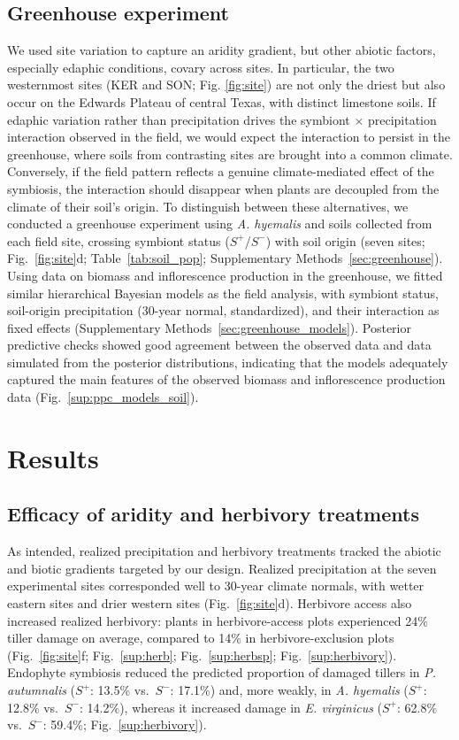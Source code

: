 \documentclass[12pt]{article}\usepackage[]{graphicx}\usepackage[dvipsnames]{xcolor}
\begin{document}
\subsection*{Greenhouse experiment}
We used site variation to capture an aridity gradient, but other abiotic factors, especially edaphic conditions, covary across sites. 
In particular, the two westernmost sites (KER and SON; Fig. \ref{fig:site}) are not only the driest but also occur on the Edwards Plateau of central Texas, with distinct limestone soils.
If edaphic variation rather than precipitation drives the symbiont $\times$ precipitation interaction observed in the field, we would expect the interaction to persist in the greenhouse, where soils from contrasting sites are brought into a common climate. 
Conversely, if the field pattern reflects a genuine climate-mediated effect of the symbiosis, the interaction should disappear when plants are decoupled from the climate of their soil's origin. 
To distinguish between these alternatives, we conducted a greenhouse experiment using \textit{A. hyemalis} and soils collected from each field site, crossing symbiont status ($S^+$/$S^-$) with soil origin (seven sites; Fig.~\ref{fig:site}d; 
Table~\ref{tab:soil_pop}; Supplementary Methods~\ref{sec:greenhouse}).
Using data on biomass and inflorescence production in the greenhouse, we fitted similar hierarchical Bayesian models as the field analysis, with symbiont status, soil-origin precipitation (30-year normal, standardized), and their interaction as fixed effects (Supplementary Methods~\ref{sec:greenhouse_models}).
Posterior predictive checks showed good agreement between the observed data and data simulated from the posterior distributions, indicating that the models adequately captured the main features of the observed biomass and inflorescence production data (Fig.~\ref{sup:ppc_models_soil}).

\section*{Results}
\subsection*{Efficacy of aridity and herbivory treatments}

As intended, realized precipitation and herbivory treatments tracked the abiotic and biotic gradients targeted by our design. 
Realized precipitation at the seven experimental sites corresponded well to 30-year climate normals, with wetter eastern sites and drier western sites (Fig.~\ref{fig:site}d). 
Herbivore access also increased realized herbivory: plants in herbivore-access plots experienced 24\% tiller damage on average, compared to 14\% in herbivore-exclusion plots (Fig.~\ref{fig:site}f; Fig.~\ref{sup:herb}; Fig.~\ref{sup:herbsp}; Fig.~\ref{sup:herbivory}).
Endophyte symbiosis reduced the predicted proportion of damaged tillers in \textit{P. autumnalis} ($S^+$: 13.5\% vs.\ $S^-$: 17.1\%) and, more weakly, in \textit{A. hyemalis} ($S^+$: 12.8\% vs.\ $S^-$: 14.2\%), whereas it increased damage in \textit{E. virginicus} ($S^+$: 62.8\% vs.\ $S^-$: 59.4\%; Fig.~\ref{sup:herbivory}).
\end{document}
